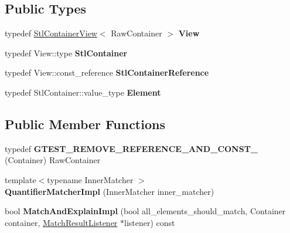 \subsection*{Public Types}
\begin{DoxyCompactItemize}
\item 
\mbox{\label{classtesting_1_1internal_1_1_quantifier_matcher_impl_aa1e6b1653b6fdee1b0cfc4c58a9059e6}} 
typedef \mbox{\hyperlink{classtesting_1_1internal_1_1_stl_container_view}{Stl\+Container\+View}}$<$ Raw\+Container $>$ {\bfseries View}
\item 
\mbox{\label{classtesting_1_1internal_1_1_quantifier_matcher_impl_a7faa9a49c627e6db66e0ff9cdc88b6fc}} 
typedef View\+::type {\bfseries Stl\+Container}
\item 
\mbox{\label{classtesting_1_1internal_1_1_quantifier_matcher_impl_a341dd7815b3c6090d935026daac6e938}} 
typedef View\+::const\+\_\+reference {\bfseries Stl\+Container\+Reference}
\item 
\mbox{\label{classtesting_1_1internal_1_1_quantifier_matcher_impl_a6f73e2e5fa853f8b5fdd33d6a1811f9e}} 
typedef Stl\+Container\+::value\+\_\+type {\bfseries Element}
\end{DoxyCompactItemize}
\subsection*{Public Member Functions}
\begin{DoxyCompactItemize}
\item 
\mbox{\label{classtesting_1_1internal_1_1_quantifier_matcher_impl_aa3648a9fce92090dc3987eb10faf16e1}} 
typedef {\bfseries G\+T\+E\+S\+T\+\_\+\+R\+E\+M\+O\+V\+E\+\_\+\+R\+E\+F\+E\+R\+E\+N\+C\+E\+\_\+\+A\+N\+D\+\_\+\+C\+O\+N\+S\+T\+\_\+} (Container) Raw\+Container
\item 
\mbox{\label{classtesting_1_1internal_1_1_quantifier_matcher_impl_aef125c9971ea1d02d138cd8fd2af0287}} 
{\footnotesize template$<$typename Inner\+Matcher $>$ }\\{\bfseries Quantifier\+Matcher\+Impl} (Inner\+Matcher inner\+\_\+matcher)
\item 
\mbox{\label{classtesting_1_1internal_1_1_quantifier_matcher_impl_ab8f64532b70f47fc60f7983ebe5cbfc6}} 
bool {\bfseries Match\+And\+Explain\+Impl} (bool all\+\_\+elements\+\_\+should\+\_\+match, Container container, \mbox{\hyperlink{classtesting_1_1_match_result_listener}{Match\+Result\+Listener}} $\ast$listener) const
\end{DoxyCompactItemize}
